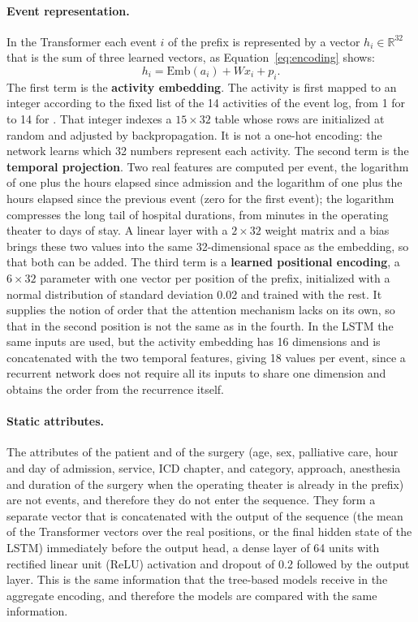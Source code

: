 \paragraph{Event representation.} In the Transformer each event $i$ of the prefix is represented by a vector $h_i \in \mathbb{R}^{32}$ that is the sum of three learned vectors, as Equation~\ref{eq:encoding} shows:
\begin{equation}
  h_i = \mathrm{Emb}(a_i) + W x_i + p_i .
  \label{eq:encoding}
\end{equation}
The first term is the \textbf{activity embedding}. The activity is first mapped to an integer according to the fixed list of the 14 activities of the event log, from 1 for  to 14 for . That integer indexes a $15 \times 32$ table whose rows are initialized at random and adjusted by backpropagation. It is not a one-hot encoding: the network learns which 32 numbers represent each activity. The second term is the \textbf{temporal projection}. Two real features are computed per event, the logarithm of one plus the hours elapsed since admission and the logarithm of one plus the hours elapsed since the previous event (zero for the first event); the logarithm compresses the long tail of hospital durations, from minutes in the operating theater to days of stay. A linear layer with a $2 \times 32$ weight matrix and a bias brings these two values into the same 32-dimensional space as the embedding, so that both can be added. The third term is a \textbf{learned positional encoding}, a $6 \times 32$ parameter with one vector per position of the prefix, initialized with a normal distribution of standard deviation 0.02 and trained with the rest. It supplies the notion of order that the attention mechanism lacks on its own, so that  in the second position is not the same as in the fourth. In the LSTM the same inputs are used, but the activity embedding has 16 dimensions and is concatenated with the two temporal features, giving 18 values per event, since a recurrent network does not require all its inputs to share one dimension and obtains the order from the recurrence itself.

\paragraph{Static attributes.} The attributes of the patient and of the surgery (age, sex, palliative care, hour and day of admission, service, ICD chapter, and category, approach, anesthesia and duration of the surgery when the operating theater is already in the prefix) are not events, and therefore they do not enter the sequence. They form a separate vector that is concatenated with the output of the sequence (the mean of the Transformer vectors over the real positions, or the final hidden state of the LSTM) immediately before the output head, a dense layer of 64 units with rectified linear unit (ReLU) activation and dropout of 0.2 followed by the output layer. This is the same information that the tree-based models receive in the aggregate encoding, and therefore the models are compared with the same information.


